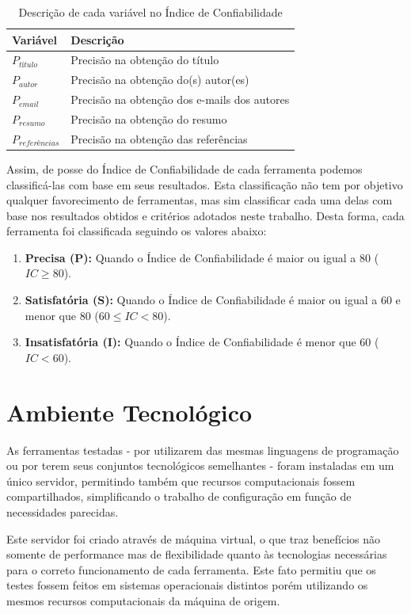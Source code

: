 \begin{table}
    \caption{Descrição de cada variável no Índice de Confiabilidade}
    \begin{center}
        \begin{tabular}{|p{3cm}|p{8cm}|}
            \hline \textbf{Variável} & \textbf{Descrição}\\ 
            \hline $P_{título}$ & Precisão na obtenção do título \\
            \hline $P_{autor}$ & Precisão na obtenção do(s) autor(es)\\
            \hline $P_{email}$ & Precisão na obtenção dos e-mails dos autores \\
            \hline $P_{resumo}$ & Precisão na obtenção do resumo \\
            \hline $P_{referências}$ & Precisão na obtenção das referências \\
            \hline 
        \end{tabular} 
    \end{center}
    \label{tab:confiability-index}
\end{table}

Assim, de posse do Índice de Confiabilidade de cada ferramenta podemos classificá-las com base em seus resultados. Esta classificação não tem por objetivo qualquer favorecimento de ferramentas, mas sim classificar cada uma delas com base nos resultados obtidos e critérios adotados neste trabalho. Desta forma, cada ferramenta foi classificada seguindo os valores abaixo:

\begin{enumerate}
    \item \textbf{Precisa (P):} Quando o Índice de Confiabilidade é maior ou igual a 80 ($IC\geq80$).
    \item \textbf{Satisfatória (S):} Quando o Índice de Confiabilidade é maior ou igual a 60 e menor que 80 ($60 \leq IC < 80$).
    \item \textbf{Insatisfatória (I):} Quando o Índice de Confiabilidade é menor que 60 ($IC < 60$).
\end{enumerate}

\section{Ambiente Tecnológico}
\label{sec:tech-environment}

As ferramentas testadas - por utilizarem das mesmas linguagens de programação ou por terem seus conjuntos tecnológicos semelhantes - foram instaladas em um único servidor, permitindo também que recursos computacionais fossem compartilhados, simplificando o trabalho de configuração em função de necessidades parecidas.

Este servidor foi criado através de máquina virtual, o que traz benefícios não somente de performance mas de flexibilidade quanto às tecnologias necessárias para o correto funcionamento de cada ferramenta. Este fato permitiu que os testes fossem feitos em sistemas operacionais distintos porém utilizando os mesmos recursos computacionais da máquina de origem.


